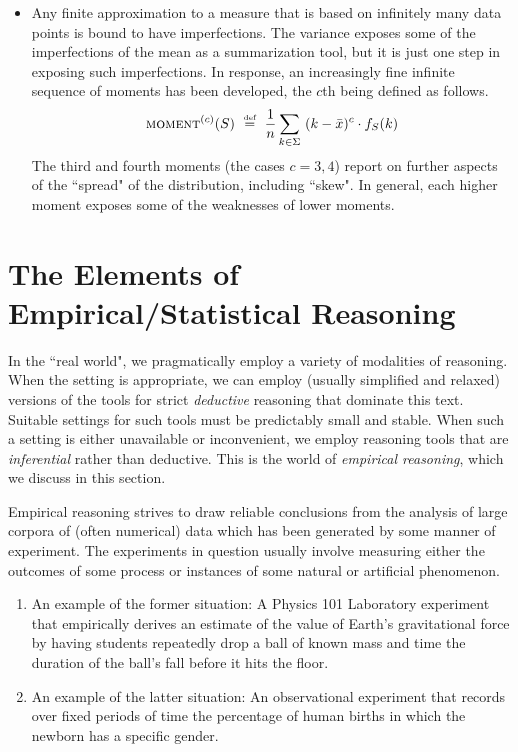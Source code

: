 \begin{itemize}
\item
Any finite approximation to a measure that is based on infinitely many data points is bound to have imperfections.  The variance exposes some of the imperfections of the mean as a summarization tool, but it is just one step in exposing such imperfections.  In response, an increasingly fine infinite sequence of moments has been developed, the $c$th being defined as follows.
\[
\mbox{\sc moment}^{(c)}(S) \ \stackrel{\mbox{{\tiny def}}}{=} \ {1 \over n} \sum_{k \in \Sigma} \ (k - \bar{x})^c \cdot f_S(k)
\]
The third and fourth moments (the cases $c = 3,4$) report on further aspects of the ``spread" of the distribution, including ``skew".  In general, each higher moment exposes some of the weaknesses of lower moments.
\end{itemize}


\section{The Elements of Empirical/Statistical Reasoning}
\label{sec:empirical}

In the ``real world", we pragmatically employ a variety of modalities of reasoning.  When the setting is appropriate, we can employ (usually simplified and relaxed) versions of the tools for strict {\em deductive} reasoning that dominate this text.  Suitable settings for such tools must be predictably small and stable.  When such a setting is either unavailable or inconvenient, we employ reasoning tools that are {\em inferential} rather than deductive.  This is the world of {\em empirical reasoning}, which we discuss in this section.

\bigskip

Empirical reasoning strives to draw reliable conclusions from the analysis of large corpora of (often numerical) data which has been generated by some manner of experiment.  The experiments in question usually involve measuring either the outcomes of some process or instances of some natural or artificial phenomenon.
\begin{enumerate}
\item
An example of the former situation:  A Physics 101 Laboratory experiment that empirically derives an estimate of the value of Earth's gravitational force by having students repeatedly drop a ball of known mass and time the duration of the ball's fall before it hits the floor.

\item
An example of the latter situation:  An observational experiment that records over fixed periods of time the percentage of human births in which the newborn has a specific gender.
\end{enumerate}

